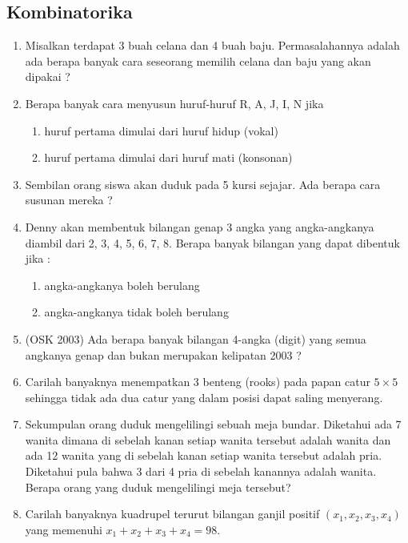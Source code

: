 \documentclass[11pt]{scrartcl}
\begin{document}
\subsection{Kombinatorika}
\begin{enumerate}
    \item Misalkan terdapat 3 buah celana dan 4 buah baju. Permasalahannya adalah ada berapa banyak cara 
seseorang memilih celana dan baju yang akan dipakai ?

    \item Berapa banyak cara menyusun huruf-huruf R, A, J, I, N jika 
\begin{enumerate}
    \item huruf pertama dimulai dari huruf hidup (vokal) 
    \item huruf pertama dimulai dari huruf mati (konsonan) 
\end{enumerate}

    \item Sembilan orang siswa akan duduk pada 5 kursi sejajar. Ada berapa cara susunan mereka ? 
    
    \item Denny akan membentuk bilangan genap 3 angka yang angka-angkanya diambil dari 2, 3, 4, 5, 6, 7, 8. 
Berapa banyak bilangan yang dapat dibentuk jika : 
    \begin{enumerate}
        \item angka-angkanya boleh berulang 
\item angka-angkanya tidak boleh berulang
    \end{enumerate}
    
    \item (OSK 2003) Ada berapa banyak bilangan 4-angka (digit) yang semua angkanya genap dan bukan 
merupakan kelipatan 2003 ?
    \item  Carilah banyaknya menempatkan 3 benteng (rooks) pada papan catur $5 \times 5$ sehingga
tidak ada dua catur yang dalam posisi dapat saling menyerang.

    \item Sekumpulan orang duduk mengelilingi sebuah meja bundar. Diketahui ada 7 wanita
dimana di sebelah kanan setiap wanita tersebut adalah wanita dan ada 12 wanita yang di
sebelah kanan setiap wanita tersebut adalah pria. Diketahui pula bahwa 3 dari 4 pria di
sebelah kanannya adalah wanita. Berapa orang yang duduk mengelilingi meja tersebut?

    \item Carilah banyaknya kuadrupel terurut bilangan ganjil positif $(x_1, x_2, x_3, x_4)$ yang memenuhi
$x_1 + x_2 + x_3 + x_4 = 98$.


\end{enumerate}
\end{document}
